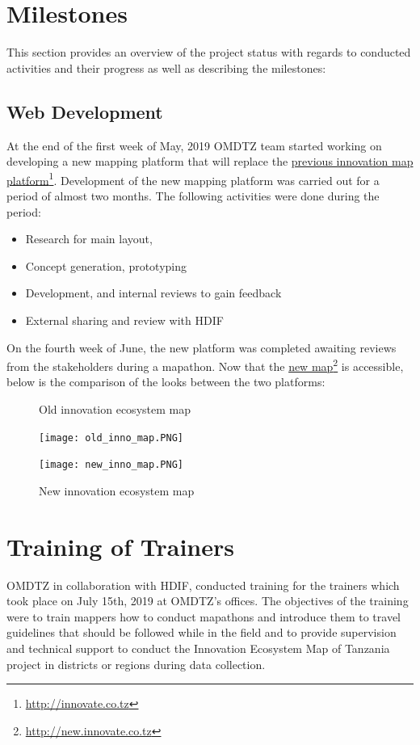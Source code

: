 \documentclass[a4paper,12pt,twoside]{article}
\begin{document}
\section{Milestones}
This section provides an overview of the project status with regards to conducted activities and their progress as well as describing the milestones:

\subsection{Web Development}
At the end of the first week of May, 2019 OMDTZ team started working on developing a new mapping platform that will replace the \href{http://innovate.co.tz}{previous innovation map platform}\footnote{\url{http://innovate.co.tz}}. Development of the new mapping platform was carried out for a period of almost two months. The following activities were done during the period:

\begin{itemize}
	\item Research for main layout,
	\item Concept generation, prototyping
	\item Development, and internal reviews to gain feedback
	\item External sharing and review with HDIF
\end{itemize}

On the fourth week of June, the new platform was completed awaiting reviews from the stakeholders during a mapathon. Now that the \href{http://new.innovate.co.tz}{new map}\footnote{\url{http://new.innovate.co.tz}} is accessible, below is the comparison of the looks between the two platforms:

\begin{figure}
	\caption{Old innovation ecosystem map}
	\texttt{[image: old\_inno\_map.PNG]}
	\
	\
	\
	\caption{New innovation ecosystem map}
	\texttt{[image: new\_inno\_map.PNG]}
\end{figure}

\newpage
\section{Training of Trainers}
OMDTZ in collaboration with HDIF, conducted training for the trainers which took place on July 15th, 2019 at OMDTZ’s offices. The objectives of the training were to train mappers how to conduct mapathons and introduce them to travel guidelines that should be followed while in the field and to provide supervision and technical support to conduct the Innovation Ecosystem Map of Tanzania project in districts or regions during data collection.
\end{document}
